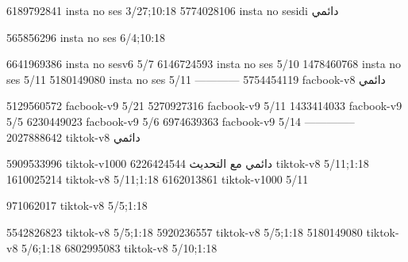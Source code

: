 
6189792841 insta no ses
3/27;10:18
5774028106 insta no sesidi
دائمي


565856296 insta no ses
6/4;10:18

6641969386 insta no sesv6
5/7
6146724593 insta no ses
5/10
1478460768 insta no ses
5/11
5180149080 insta no ses
5/11
------------
5754454119 facbook-v8
دائمي

5129560572 facbook-v9
5/21
5270927316 facbook-v9
5/11
1433414033 facbook-v9
5/5
6230449023 facbook-v9
5/6
6974639363 facbook-v9
5/14
--------------
2027888642 tiktok-v8
دائمي

5909533996 tiktok-v1000
دائمي مع التحديث
6226424544 tiktok-v8
5/11;1:18
1610025214 tiktok-v8
5/11;1:18
6162013861 tiktok-v1000
5/11


971062017 tiktok-v8
5/5;1:18

5542826823 tiktok-v8
5/5;1:18
5920236557 tiktok-v8
5/5;1:18
5180149080 tiktok-v8
5/6;1:18
6802995083 tiktok-v8
5/10;1:18
